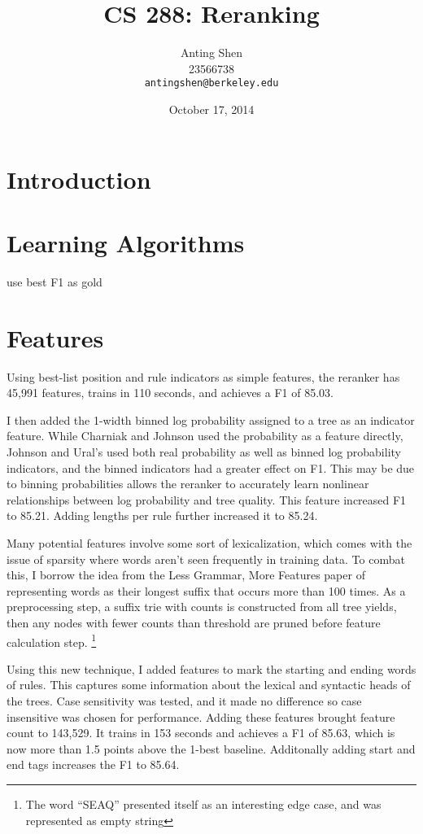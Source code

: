 \documentclass[11pt]{article}
\title{CS 288: Reranking}
\author{Anting Shen \\
  23566738 \\
  {\tt antingshen@berkeley.edu} \\
}
\date{October 17, 2014}
\begin{document}
\maketitle

\section{Introduction}


\section{Learning Algorithms}

use best F1 as gold

\section{Features}

Using best-list position and rule indicators as simple features, the reranker has 45,991 features,
trains in 110 seconds, and achieves a F1 of 85.03.

I then added the 1-width binned log probability assigned to a tree as an indicator feature.
While Charniak and Johnson used the probability as a feature directly,
Johnson and Ural's used both real probability as well as binned log probability indicators,
and the binned indicators had a greater effect on F1. This may be due to binning probabilities
allows the reranker to accurately learn nonlinear relationships between log probability and tree quality.
This feature increased F1 to 85.21. Adding lengths per rule further increased it to 85.24.

Many potential features involve some sort of lexicalization, which comes with the issue of sparsity
where words aren't seen frequently in training data. To combat this, I borrow the idea from the
Less Grammar, More Features paper of representing words as their longest suffix that occurs more
than 100 times. As a preprocessing step, a suffix trie with counts is constructed from
all tree yields, then any nodes with fewer counts than threshold are pruned before feature calculation step.
\footnote{The word ``SEAQ'' presented itself as an interesting edge case, and was represented
as empty string}

Using this new technique, I added features to mark the starting and ending words of rules.
This captures some information about the lexical and syntactic heads of the trees.
Case sensitivity was tested, and it made no difference so case insensitive was chosen for performance.
Adding these features brought feature count to 143,529. It trains in 153 seconds
and achieves a F1 of 85.63, which is now more than 1.5 points above the 1-best baseline.
Additonally adding start and end tags increases the F1 to 85.64.
\end{document}
